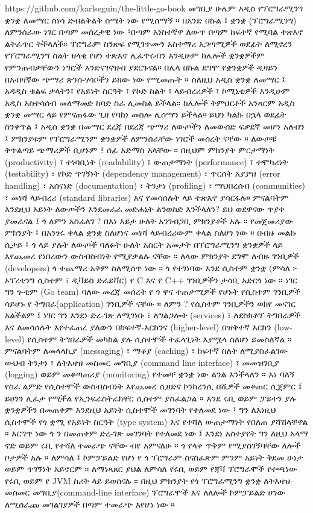 \documentclass[12pt,a4paper]{report}
\begin{document}
https://github.com/karlseguin/the-little-go-book
\vskip 0.3in
\huge
\noindent
መግቢያ
\normalsize
\vskip 0.3in
\noindent
ሁሌም አዲስ የፕሮግራሚንግ ቋንቋ ለመማር ስነሳ ድብልቅልቅ ስሜት ነው የሚሰማኝ ። በአንድ በኩል ፤ ቋንቋ (ፕሮግራሚንግ) ለምንሰራው ነገር በጣም መሰረታዊ ነው ፤በጣም አነስተኛዋ ለውጥ በጣም ከፍተኛ የሚባል ተጽእኖ ልትፈጥር ትችላለች። ፕሮግራም ስንጽፍ የሚገጥሙን አስተማሪ አጋጣሚዎች ወደፊት ለሚኖረን የፕሮግራሚንግ ስልት ዘላቂ የሆነ ተጽእኖ ሊፈጥሩብን እንዲሁም ከሌሎች ቋንቋዎችም የምንጠብቃቸውን ነግሮች እንድናገናዝብ ያደርጉናል። በሌላ በኩል ደግሞ የቋንቋዎች ዲዛይን በአብዛኛው ጭማሪ ጽንሰ-ሃሳቦችን ይዘው ነው የሚመጡት ። ስለዚህ አዲስ ቋንቋ ለመማር ፤ አዳዲስ ቁልፍ ቃላትን፣ የአይነት ስርዓት ፣ የኮድ ስልት ፣ ላይብረሪዎች ፣ ኮሚኒቲዎች እንዲሁም አዲስ አስተሳሰብ መለማመድ ከባድ ስራ ሊመስል ይችላል። ከሌሎች ትምህርቶች አንጻርም አዲስ ቋንቋ መማር ላይ የምናጠፋው ጊዘ የባከነ መስሎ ሊሰማን ይችላል።
\vskip 0.3in
\noindent
ይህን ካልኩ በኋላ ወደፊት ስንቀጥል ፤ አዲስ ቋንቋ በመማር ደረጃ በደረጃ ጭማሪ ለውጦችን ለመውሰድ ፍቃደኛ መሆን አለብን ፤ ምክንያቱም የፕሮግራሚንም ቋንቋዎች ለምንሰራቸው ነገሮች መሰረት ናቸው ። ለውጦቹ ቅጥልጣይ ጭማሪዎች ቢሆኑም ፤ ሰፊ አድማስ አላቸው ። በዚህም ምክንያት ምርታማነት (productivity) ፣ ተነባቢነት (readability) ፣ ውጠታማነት (performance) ፣ ተሞካሪነት (testability) ፣ የኮድ ጥገኝነት (dependency management) ፣ ጥርሰት አያያዝ (error handling) ፣ አሰናነድ (documentation) ፣ ትንታነ (profiling) ፣ ማህበረሰብ (communities) ፣ መነሻ ላይብረሪ (standard libraries) እና የመሳሰሉት ላይ ተጽእኖ ያሳርፋሉ። ምናልባትም እንደዚህ አይነት ለውጦችን እንደመራራ መድሐኒት ልንወስድ እንችላለን?
\vskip 0.3in
\noindent
ይህ ወደዋናው ጥያቀ ያመራናል ፤ ጎ ለምን አስፈለገ ? በእነ እይታ ሁለት አንገብጋቢ ምክንያቶች አሉ ። የመጀመሪያው ምክንያት ፤ በአንፃሩ ቀላል ቋንቋ ስለሆነና መነሻ ላይብረሪውም ቀላል ስለሆነ ነው ። በብዙ መልኩ ሲታይ ፤ ጎ ላይ ያሉት ለውጦች ባለፉት ሁለት አስርት አመታት በፕሮግራሚንግ ቋንቋዎች ላይ እየጨመረ የነበረውን ውስብስብነት የሚያቃልሉ ናቸው ። ለላው ምክንያት ደግሞ ለብዙ ገንቢዎች (developers) ጎ ተጨማሪ አቅም ስለሚሰጥ ነው ።
\vskip 0.3in
\noindent
ጎ የተገነባው እንደ ሲስተም ቋንቋ (ምሳለ ፦ ኦፐረቲንግ ሲስተም ፣ ዲቫይስ ድራይቨር) የ C እና የ C++ ገንቢዎችን ታሳቢ አድርጎ ነው ። ነገር ግን ጎ-ቲም (Go team) ባለው መረጃ መሰረት የ ጎ ዋና ተጠቃሚዎች የሆኑት የሲስተም ገንቢዎች ሳይሆኑ የ ትግበራ(application) ገንቢዎች ናቸው ። ለምን ? የሲስተም ገንቢዎችን ወክየ መናገር አልችልም ፤ ነገር ግን እንደነ ድረ-ገጽ ለሚገነቡ ፣ ለግልጋሎት (services) ፣ ለደስክቶፕ ትግበራዎች እና ለመሳሰሉት እየተፈጠረ ያለውን በከፍተኛ-እርከንና (higher-level) በዝቅተኛ እርከን (low-level) የሲስተም ትግበራዎች መካከል ያሉ ሲስተሞች ተፈላጊነት እያሟላ ስለሆነ ይመስለኛል ። 
\vskip 0.3in
\noindent
ምናልባትም ለመላላኪያ (messaging) ፣ ማቆያ (caching) ፣ ከፍተኛ ስለት ለሚያስፈልገው ውህብ ትንታነ ፣ ለትእዛዝ መስመር መግቢያ (command line interface) ፣ መመዝገቢያ (logging) ወይም መቆጣጠሪያ (monitoring) የተመቸ ቋንቋ ነው ልንል እንችላለን ። እነ ባለኝ የስራ ልምድ የሲስተሞች ውስብስብነት እየጨመረ ሲሀድና ኮንከረንሲ በሺዎች መቆጠር ሲጀምር ፤ ይሀንን ሊፈታ የሚችል የኢንፍራስትራክቸር ሲስተም ያስፈልጋል ። እንደ ሩቢ ወይም ፓይተን ያሉ ቋንቋዎችን በመጠቀም እንደዚህ አይነት ሲስተሞች መገንባት የተለመደ ነው ፤ ግን ለእነዚህ ሲስተሞች የጎ ቋሚ የአይነት ስርዓት (type system) እና የተሻለ ውጠታማነት የበለጠ ያሻሽላቸዋል ። እርግጥ ነው ጎ ን በመጠቀም ድረ-ገጽ መገንባት የተለመደ ነው ፤ እንደነ አስተያየት ግን ለዚህ አላማ ኖድ ወይም ሩቢ የተሻለ ተመራጭ ናቸው ብየ አምናለሁ ።
\vskip 0.3in
\noindent
ጎ የላቀ ጥቅም የሚያስገኝባቸው ለሎች ቦታዎች አሉ ። ለምሳለ ፤ ኮምፓይልድ የሆነ የ ጎ ፕሮግራም ስናስፈጽም ምንም አይነት ቅደመ ሁነታ ወይም ጥገኝነት አይኖርም ። ለማነጻጸር ያህል ለምሳለ የሩቢ ወይም የጃቫ ፕሮግራሞች የተጫነው የሩቢ ወይም የ JVM ስሪት ላይ ይወሰናሉ ። በዚህ ምክንያት የጎ ፕሮግራሚንግ ቋንቋ ለትእዛዝ-መስመር መግቢያ(command-line interface) ፕሮግራሞች እና ለለሎች ኮምፓይልድ ሆነው ለሚሰራጩ መገልገያዎች በጣም ተመራጭ እየሆነ ነው ።
\end{document}
